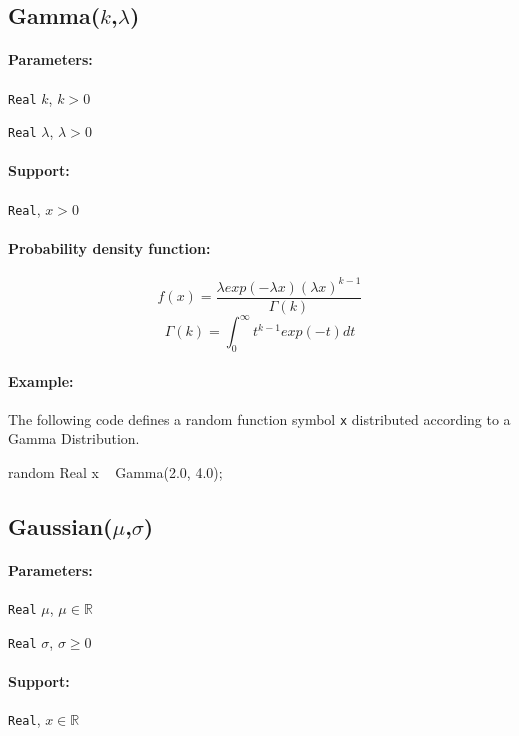 \subsection{Gamma($k$,$\lambda$)}

\paragraph*{Parameters:}
\begin{itemize*}
\item[] \verb|Real| $k$, $k > 0$
\item[] \verb|Real| $\lambda$, $\lambda > 0$ 
\end{itemize*}

\paragraph*{Support:}
\verb|Real|, $x > 0$

\paragraph*{Probability density function:}
\[
	f(x) = \frac{\lambda exp(-\lambda x) (\lambda x)^{k-1}}{\Gamma(k)}
\]
\[
	\Gamma(k) = \int_{0}^{\infty} t^{k-1}exp(-t) dt
\]

\paragraph*{Example:}
The following code defines a random function symbol \verb|x| distributed according to a Gamma Distribution.
\begin{blogcode}
random Real x ~ Gamma(2.0, 4.0);
\end{blogcode}

\subsection{Gaussian($\mu$,$\sigma$)}

\paragraph*{Parameters:} 
\begin{itemize*}
\item[] \verb|Real|
 $\mu$, $\mu \in \mathbb{R}$
\item[] \verb|Real|
 $\sigma$, $\sigma \geq 0$ 
\end{itemize*}

\paragraph*{Support:} \verb|Real|, $x \in \mathbb{R}$ 


